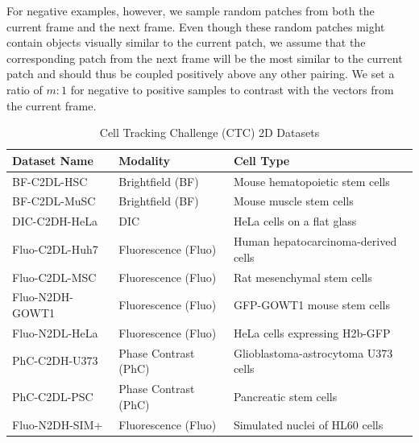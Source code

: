 \documentclass[./dissertation.tex]{subfiles}
\begin{document}
For negative examples, however, we sample random patches from both the current frame and the next frame. Even though these random patches might contain objects visually similar to the current patch, we assume that the corresponding patch from the next frame will be the most similar to the current patch and should thus be coupled positively above any other pairing. We set a ratio of \(m : 1\) for negative to positive samples to contrast with the vectors from the current frame.


\begin{table}
    \caption{Cell Tracking Challenge (CTC) 2D Datasets}
    \centering

    \label{tab:ctc_datasets}
    \begin{tabular}{|l|l|l|}
        \hline
        \textbf{Dataset Name} & \textbf{Modality}    & \textbf{Cell Type}                  \\ \hline
        BF-C2DL-HSC           & Brightfield (BF)     & Mouse hematopoietic stem cells      \\ \hline
        BF-C2DL-MuSC          & Brightfield (BF)     & Mouse muscle stem cells             \\ \hline
        DIC-C2DH-HeLa         & DIC                  & HeLa cells on a flat glass          \\ \hline
        Fluo-C2DL-Huh7        & Fluorescence (Fluo)  & Human hepatocarcinoma-derived cells \\ \hline
        Fluo-C2DL-MSC         & Fluorescence (Fluo)  & Rat mesenchymal stem cells          \\ \hline
        Fluo-N2DH-GOWT1       & Fluorescence (Fluo)  & GFP-GOWT1 mouse stem cells          \\ \hline
        Fluo-N2DL-HeLa        & Fluorescence (Fluo)  & HeLa cells expressing H2b-GFP       \\ \hline
        PhC-C2DH-U373         & Phase Contrast (PhC) & Glioblastoma-astrocytoma U373 cells \\ \hline
        PhC-C2DL-PSC          & Phase Contrast (PhC) & Pancreatic stem cells               \\ \hline
        Fluo-N2DH-SIM+        & Fluorescence (Fluo)  & Simulated nuclei of HL60 cells      \\ \hline
    \end{tabular}
\end{table}




\end{document}
